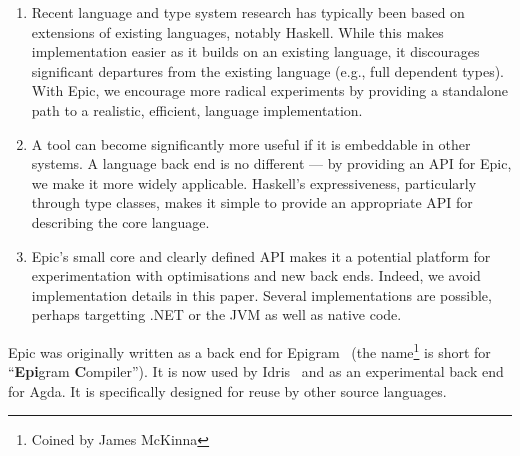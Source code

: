 \begin{enumerate}
\item Recent language and type system research has typically been
  based on extensions of existing languages, notably Haskell. While
  this makes implementation easier as it builds on an existing
  language, it discourages significant departures from the existing
  language (e.g., full dependent types). With Epic, we encourage
  more radical experiments by providing a standalone path to a realistic,
  efficient, language implementation.
\item A tool can become significantly more useful if it is embeddable in
  other systems. A language back end is no different --- by providing
  an API for Epic, we make it more widely applicable. Haskell's
  expressiveness, particularly through type classes, makes it simple
  to provide an appropriate API for describing the core language.
\item Epic's small core and clearly defined API makes it a potential
  platform for experimentation with optimisations and new back
  ends. Indeed, we avoid implementation details in
  this paper. Several implementations are possible, perhaps targetting
  .NET or the JVM as well as native code.
\end{enumerate}

\noindent
Epic was originally written as a back end for
Epigram~\cite{levitation} (the name\footnote{Coined by James McKinna}
is short for ``\textbf{Epi}gram \textbf{C}ompiler''). It is now used
by Idris~\cite{plpv11} and as an experimental back end for
Agda. It is specifically designed for reuse by other source languages.





